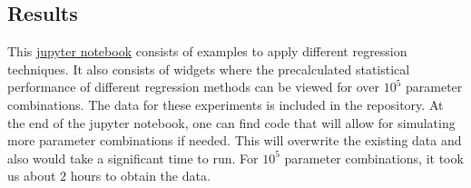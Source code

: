 \subsection{Results} \label{subsec:results_linear_regression}

This \href{https://github.com/am-kaiser/CompSci-Project-1/blob/main/regression_analysis/examples/linear_regression_analysis.ipynb}{jupyter notebook} consists of examples to apply different regression techniques. It also consists of widgets where the precalculated statistical performance of different regression methods can be viewed for over $10^5$ parameter combinations. The data for these experiments is included in the repository. At the end of the jupyter notebook, one can find code that will allow for simulating more parameter combinations if needed. This will overwrite the existing data and also would take a significant time to run. For $10^5$ parameter combinations, it took us about $2$ hours to obtain the data.

